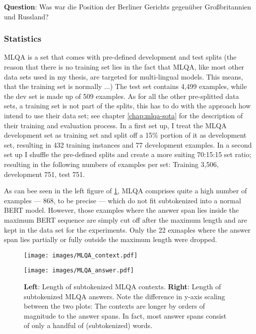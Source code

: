 \begin{examples}
        \textbf{Question}: Was war die Position der Berliner Gerichts gegenüber Großbritannien und Russland?\\
\end{examples}



\subsubsection{Statistics}

MLQA is a set that comes with pre-defined development and test splits {\color{red} (the
reason that there is no training set lies in the fact that MLQA, like most other data sets
used in my thesis, are targeted for multi-lingual models. This means, that the training set
is normally ...)} The test set contains 4,499 examples, while the dev set is made up of 509
examples. As for all the other pre-splitted data sets, a training set is not part of the splits,
this has to do with the approach how \cite{lewis2019mlqa} intend to use their data set; see
chapter \ref{chap:mlqa-sota} for the description of their training and evaluation process.
In a first set up, I treat the MLQA development set as training set and split off a 15\% portion of
it as development set, resulting in 432 training instances and 77 development examples.
In a second set up I shuffle the pre-defined splits and create a more suiting 70:15:15 set ratio;
resulting in the following numbers of examples per set: Training 3,506, development 751, test 751.


As can bee seen in the left figure of \ref{fig:mlqa-stats}, MLQA comprises quite a high number
of examples --- 868, to be precise --- which do not fit subtokenized into a normal BERT model.
However, those examples where the answer span lies inside the maximum BERT sequence are simply
cut off after the maximum length and are kept in the data set for the experiments. Only the 22
exmaples where the answer span lies partially or fully outside the maximum length were dropped.

\begin{figure}
  \label{fig:mlqa-stats}
  \begin{minipage}{0.45\linewidth}
  \vspace{0pt}
    \texttt{[image: images/MLQA\_context.pdf]}
  \end{minipage}
  \hfill
  \begin{minipage}{0.45\linewidth}
  \vspace{0pt}
    \texttt{[image: images/MLQA\_answer.pdf]}
  \end{minipage}
  \caption[MLQA Lengths]{\textbf{Left}: Length of subtokenized MLQA contexts.
                         \textbf{Right}: Length of subtokenized MLQA answers. Note the difference in y-axis scaling between the two plots:
                         The contexts are longer by orders of magnitude to the answer spans. In fact, most answer spans consist of only a handful of
                         (subtokenized) words.}
\end{figure}

